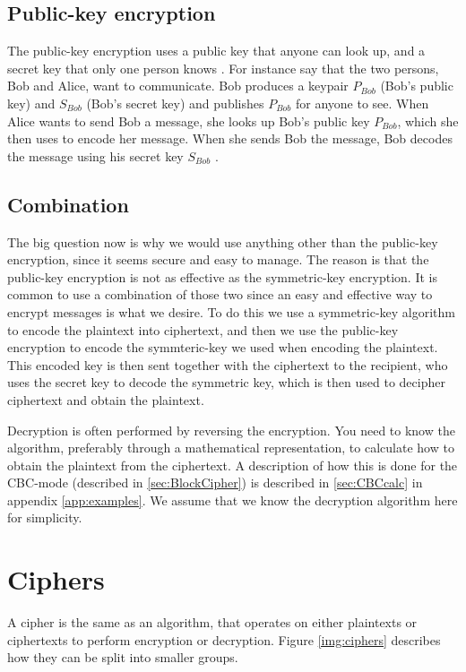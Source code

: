 \subsection{Public-key encryption}
The public-key encryption uses a public key that anyone can look up, and a 
secret key that only one person knows \citep[pp. 25--32]{Simmons:1992}.
For instance say that the two persons, Bob and Alice, want to communicate. 
Bob produces a keypair \(P_{Bob}\) (Bob’s public key) and \(S_{Bob}\) 
(Bob’s secret key) and publishes \(P_{Bob}\) for anyone to see. When Alice wants 
to send Bob a message, she looks up Bob’s public key \(P_{Bob}\), which she then 
uses to encode her message. When she sends Bob the message, Bob decodes the 
message using his secret key \(S_{Bob}\) \citep{Schneier:2003}.

\subsection{Combination}
The big question now is why we would use anything other than the public-key
encryption, since it seems secure and easy to manage. The reason is that the 
public-key encryption is not as effective as the symmetric-key encryption. 
It is common to use a combination of those two since an easy and effective way 
to encrypt messages is what we desire. To do this we use a symmetric-key 
algorithm to encode the plaintext into ciphertext, and then we use the 
public-key encryption to encode the symmteric-key we used when encoding the 
plaintext. This encoded key is then sent together with the ciphertext to the 
recipient, who uses the secret key to decode the symmetric key, which is then used to decipher ciphertext and obtain the plaintext.

Decryption is often performed by reversing the encryption. You need to know the 
algorithm, preferably through a mathematical representation, to calculate how 
to obtain the plaintext from the ciphertext. A description of how this is done 
for the CBC-mode (described in \ref{sec:BlockCipher}) is described in 
\ref{sec:CBCcalc} in appendix \ref{app:examples}. We assume that we know the 
decryption algorithm here for simplicity. 

\section{Ciphers}
A cipher is the same as an algorithm, that operates on either plaintexts or 
ciphertexts to perform encryption or decryption. Figure \ref{img:ciphers} 
describes how they can be split into smaller groups.

